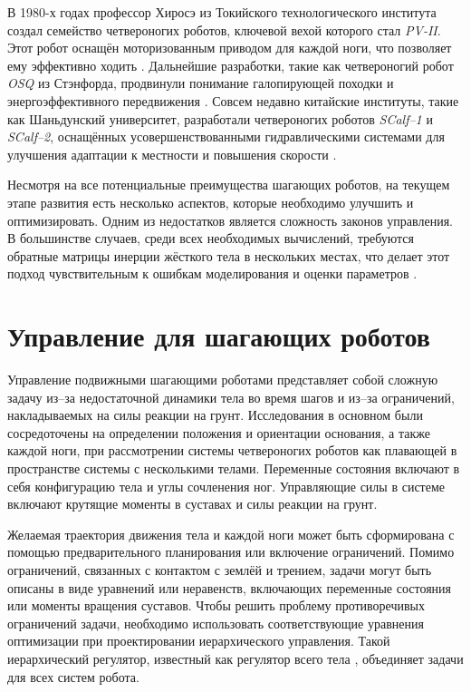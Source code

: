 В 1980-х годах профессор Хиросэ из Токийского технологического института создал семейство четвероногих роботов, ключевой вехой которого стал \textit{PV-II}. Этот робот оснащён моторизованным приводом для каждой ноги, что позволяет ему эффективно ходить \cite{Hirose2009}. Дальнейшие разработки, такие как четвероногий робот \textit{OSQ} из Стэнфорда, продвинули понимание галопирующей походки и энергоэффективного передвижения \cite{Nichol2004}.  Совсем недавно китайские институты, такие как Шаньдунский университет, разработали четвероногих роботов \textit{SCalf--1} и \textit{SCalf--2}, оснащённых усовершенствованными гидравлическими системами для улучшения адаптации к местности и повышения скорости \cite{Rong2012}.

Несмотря на все потенциальные преимущества шагающих роботов, на текущем этапе развития есть несколько аспектов, которые необходимо улучшить и оптимизировать. Одним из недостатков является сложность законов управления. В большинстве случаев, среди всех необходимых вычислений, требуются обратные матрицы инерции жёсткого тела в нескольких местах, что делает этот подход чувствительным к ошибкам моделирования и оценки параметров \cite{Nakanishi_IJRR_2008}. 

\section{Управление для шагающих роботов}\label{sec:ch1/sec2}

Управление подвижными шагающими роботами представляет собой сложную задачу из--за недостаточной динамики тела во время шагов и из--за ограничений, накладываемых на силы реакции на грунт. Исследования в основном были сосредоточены на определении положения и ориентации основания, а также каждой ноги, при рассмотрении системы четвероногих роботов как плавающей в пространстве системы с несколькими телами. Переменные состояния включают в себя конфигурацию тела и углы сочленения ног. Управляющие силы в системе включают крутящие моменты в суставах и силы реакции на грунт.

Желаемая траектория движения тела и каждой ноги может быть сформирована с помощью предварительного планирования или включение ограничений. Помимо ограничений, связанных с контактом с землёй и трением, задачи могут быть описаны в виде уравнений или неравенств, включающих переменные состояния или моменты вращения суставов. Чтобы решить проблему противоречивых ограничений задачи, необходимо использовать соответствующие уравнения оптимизации при проектировании иерархического управления. Такой иерархический регулятор, известный как регулятор всего тела \cite{fahmi2019passive}, объединяет задачи для всех систем робота. 

